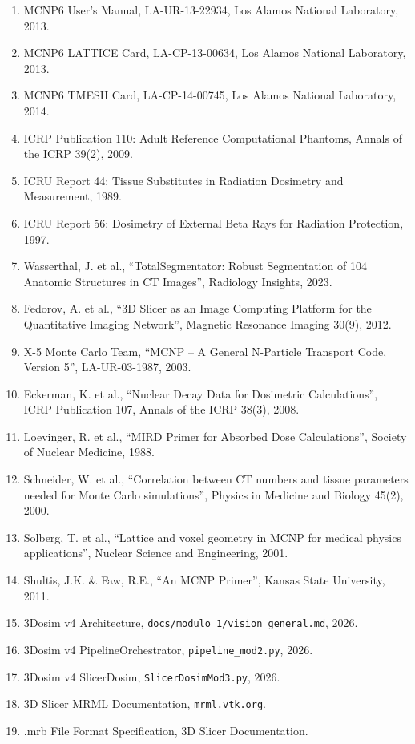 \documentclass[12pt,a4paper]{article}
\begin{document}
\begin{enumerate}
    \item MCNP6 User's Manual, LA-UR-13-22934, Los Alamos National Laboratory, 2013.
    \item MCNP6 LATTICE Card, LA-CP-13-00634, Los Alamos National Laboratory, 2013.
    \item MCNP6 TMESH Card, LA-CP-14-00745, Los Alamos National Laboratory, 2014.
    \item ICRP Publication 110: Adult Reference Computational Phantoms, Annals of the ICRP 39(2), 2009.
    \item ICRU Report 44: Tissue Substitutes in Radiation Dosimetry and Measurement, 1989.
    \item ICRU Report 56: Dosimetry of External Beta Rays for Radiation Protection, 1997.
    \item Wasserthal, J. et al., ``TotalSegmentator: Robust Segmentation of 104 Anatomic Structures in CT Images'', Radiology Insights, 2023.
    \item Fedorov, A. et al., ``3D Slicer as an Image Computing Platform for the Quantitative Imaging Network'', Magnetic Resonance Imaging 30(9), 2012.
    \item X-5 Monte Carlo Team, ``MCNP -- A General N-Particle Transport Code, Version 5'', LA-UR-03-1987, 2003.
    \item Eckerman, K. et al., ``Nuclear Decay Data for Dosimetric Calculations'', ICRP Publication 107, Annals of the ICRP 38(3), 2008.
    \item Loevinger, R. et al., ``MIRD Primer for Absorbed Dose Calculations'', Society of Nuclear Medicine, 1988.
    \item Schneider, W. et al., ``Correlation between CT numbers and tissue parameters needed for Monte Carlo simulations'', Physics in Medicine and Biology 45(2), 2000.
    \item Solberg, T. et al., ``Lattice and voxel geometry in MCNP for medical physics applications'', Nuclear Science and Engineering, 2001.
    \item Shultis, J.K. \& Faw, R.E., ``An MCNP Primer'', Kansas State University, 2011.
    \item 3Dosim v4 Architecture, \texttt{docs/modulo\_1/vision\_general.md}, 2026.
    \item 3Dosim v4 PipelineOrchestrator, \texttt{pipeline\_mod2.py}, 2026.
    \item 3Dosim v4 SlicerDosim, \texttt{SlicerDosimMod3.py}, 2026.
    \item 3D Slicer MRML Documentation, \texttt{mrml.vtk.org}.
    \item .mrb File Format Specification, 3D Slicer Documentation.
\end{enumerate}
\end{document}
